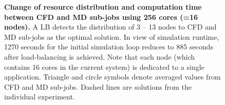 \documentclass[preprint,12pt]{elsarticle}
\begin{document}
\begin{figure}
\centering
{}
\hskip 1cm
\vskip-0.2cm
\caption[]{\small {\bf Change of resource distribution and computation time between CFD and MD sub-jobs using 256 cores (=16 nodes).} A LB detects the distribution of 3 -- 13 nodes to CFD and MD sub-jobs as the optimal solution. In view of simulation runtime, 1270 seconds for the initial simulation loop reduces to 885 seconds after load-balancing is achieved. Note that each node (which contains 16 cores in the current system) is dedicated to a single application. Triangle and circle symbols denote averaged values from CFD and MD sub-jobs. Dashed lines are solutions from the individual experiment.
}
\label{Fig:LBSmall}
\end{figure}
\end{document}

